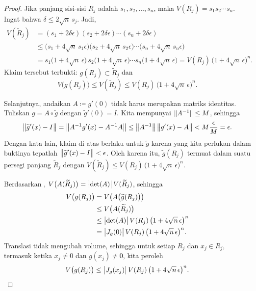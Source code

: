 \begin{proof}
Jika panjang sisi-sisi $R_j$ adalah $s_1,s_2,\ldots,s_n$, maka
$V(R_j) = s_1 s_2 \cdots s_n$.   Ingat bahwa $\delta \leq 2\sqrt{n} \, s_j$.
Jadi,
\begin{equation*}
\begin{split}
V(\widetilde{R}_j) & =
(s_1+2\delta \epsilon )
(s_2+2\delta \epsilon )
\cdots
(s_n+2\delta \epsilon )
\\
& \leq
\bigl(s_1+4 \sqrt{n}\,s_1 \epsilon \bigr)
\bigl(s_2+4 \sqrt{n}\,s_2 \epsilon \bigr)
\cdots
\bigl(s_n+4 \sqrt{n}\,s_n \epsilon \bigr)
\\
& =
s_1 \bigl(1+4 \sqrt{n}\, \epsilon \bigr)
\,
s_2 \bigl(1+4 \sqrt{n}\, \epsilon \bigr)
\cdots
s_n \bigl(1+4 \sqrt{n}\, \epsilon \bigr)
=
V(R_j) \, {\bigl(1+4\sqrt{n} \, \epsilon\bigr)}^n .
\end{split}
\end{equation*}
Klaim tersebut terbukti: $g(R_j) \subset \widetilde{R}_j$ dan
\begin{equation*}
V\bigl(g(R_j)\bigr) \leq V(\widetilde{R}_j) \leq V(R_j) \,
{\bigl(1+4\sqrt{n} \, \epsilon\bigr)}^n .
\end{equation*}

Selanjutnya, andaikan $A \coloneqq g'(0)$ tidak harus merupakan matriks identitas.
Tuliskan $g = A \circ \widetilde{g}$ dengan $\widetilde{g}'(0) = I$.
Kita mempunyai $\lVert {A^{-1}} \rVert \leq M$, sehingga
\begin{equation*}
\bigl\lVert {\widetilde{g}'(x)-I} \bigr\rVert =
\bigl\lVert {A^{-1}g'(x)-A^{-1}A} \bigr\rVert \leq
\bigl\lVert {A^{-1}} \bigr\rVert\,\bigl\lVert {g'(x)-A} \bigr\rVert < M \frac{\epsilon}{M} = \epsilon .
\end{equation*}
Dengan kata lain, klaim di atas berlaku untuk $\widetilde{g}$ karena yang
kita perlukan dalam buktinya tepatlah $\bigl\lVert {\widetilde{g}'(x)-I} \bigr\rVert < \epsilon$.
Oleh karena itu,
$\widetilde{g}(R_j)$
termuat dalam suatu persegi panjang $\widetilde{R}_j$ dengan
$V(\widetilde{R}_j) \leq V(R_j) \, {\bigl(1+4\sqrt{n} \, \epsilon\bigr)}^n$.

Berdasarkan ,
$V\bigl(A(\widetilde{R}_j)\bigr) = \bigl\lvert {\det(A)} \bigr\rvert \, V(\widetilde{R}_j)$, sehingga
\begin{equation*}
\begin{split}
V\bigl(g(R_j)\bigr) & =
V\bigl(A\bigl(\widetilde{g}(R_j)\bigr)\bigr)
\\
& \leq
V\bigl(A(\widetilde{R}_j)\bigr)
\\
& \leq
\bigl\lvert {\det(A)} \bigr\rvert \, V(R_j) \,
{\bigl(1+4\sqrt{n} \, \epsilon\bigr)}^n \\
& =
\bigl\lvert {J_g(0)} \bigr\rvert \, V(R_j) \,
{\bigl(1+4\sqrt{n} \, \epsilon\bigr)}^n .
\end{split}
\end{equation*}
Translasi tidak mengubah volume, sehingga
untuk setiap $R_j$ dan $x_j \in R_j$, termasuk ketika $x_j \neq 0$ dan $g(x_j)
\neq 0$, kita peroleh
\begin{equation*}
V\bigl(g(R_j)\bigr) \leq
\bigl\lvert {J_g(x_j)} \bigr\rvert \, V(R_j) \,
{\bigl(1+4\sqrt{n} \, \epsilon\bigr)}^n .
\end{equation*}


\end{proof}
